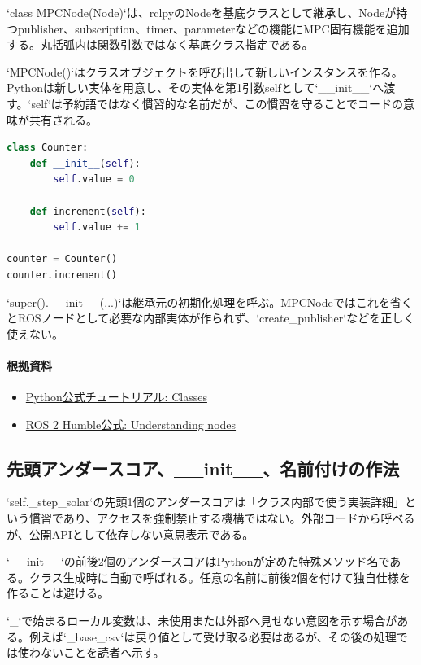 \documentclass[a4paper,11pt]{article}
\begin{document}
`class MPCNode(Node)`は、rclpyのNodeを基底クラスとして継承し、Nodeが持つpublisher、subscription、timer、parameterなどの機能にMPC固有機能を追加する。丸括弧内は関数引数ではなく基底クラス指定である。


`MPCNode()`はクラスオブジェクトを呼び出して新しいインスタンスを作る。Pythonは新しい実体を用意し、その実体を第1引数selfとして`\_\_init\_\_`へ渡す。`self`は予約語ではなく慣習的な名前だが、この慣習を守ることでコードの意味が共有される。


\begin{lstlisting}[language=python]
class Counter:
    def __init__(self):
        self.value = 0

    def increment(self):
        self.value += 1

counter = Counter()
counter.increment()
\end{lstlisting}


`super().\_\_init\_\_(...)`は継承元の初期化処理を呼ぶ。MPCNodeではこれを省くとROSノードとして必要な内部実体が作られず、`create\_publisher`などを正しく使えない。

\paragraph{根拠資料}
\begin{itemize}[leftmargin=1.6em]
\item \href{https://docs.python.org/3/tutorial/classes.html}{Python公式チュートリアル: Classes}
\item \href{https://docs.ros.org/en/humble/Tutorials/Beginner-CLI-Tools/Understanding-ROS2-Nodes/Understanding-ROS2-Nodes.html}{ROS 2 Humble公式: Understanding nodes}
\end{itemize}

\subsection{先頭アンダースコア、\_\_init\_\_、名前付けの作法}
`self.\_step\_solar`の先頭1個のアンダースコアは「クラス内部で使う実装詳細」という慣習であり、アクセスを強制禁止する機構ではない。外部コードから呼べるが、公開APIとして依存しない意思表示である。


`\_\_init\_\_`の前後2個のアンダースコアはPythonが定めた特殊メソッド名である。クラス生成時に自動で呼ばれる。任意の名前に前後2個を付けて独自仕様を作ることは避ける。


`\_`で始まるローカル変数は、未使用または外部へ見せない意図を示す場合がある。例えば`\_base\_csv`は戻り値として受け取る必要はあるが、その後の処理では使わないことを読者へ示す。
\end{document}
